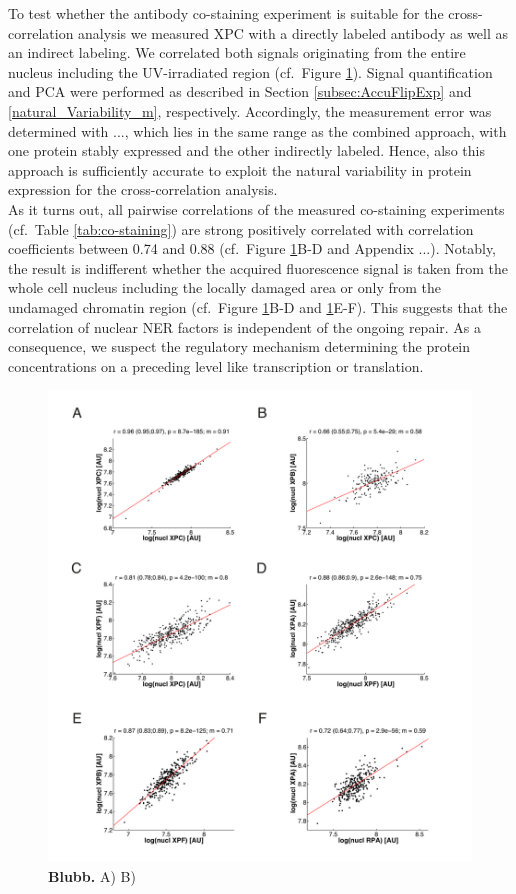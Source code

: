 To test whether the antibody co-staining experiment is suitable for the cross-correlation analysis we measured XPC with a directly labeled antibody as well as an indirect labeling. We correlated both signals originating from the entire nucleus including the UV-irradiated region (cf.\ Figure \ref{fig:coExpressionData}). Signal quantification and PCA were performed as described in Section \ref{subsec:AccuFlipExp} and \ref{natural_Variability_m}, respectively. Accordingly, the measurement error was determined with ..., which lies in the same range as the combined approach, with one protein stably expressed and the other indirectly labeled. Hence, also this approach is sufficiently accurate to exploit the natural variability in protein expression for the cross-correlation analysis.\\ 
As it turns out, all pairwise correlations of the measured co-staining experiments (cf.\ Table \ref{tab:co-staining}) are strong positively correlated with correlation coefficients between 0.74 and 0.88 (cf.\ Figure \ref{fig:coExpressionData}B-D and Appendix ...). Notably, the result is indifferent whether the acquired fluorescence signal is taken from the whole cell nucleus including the locally damaged area or only from the undamaged chromatin region (cf.\ Figure \ref{fig:coExpressionData}B-D and \ref{fig:coExpressionData}E-F). This suggests that the correlation of nuclear NER factors is independent of the ongoing repair. As a consequence, we suspect the regulatory mechanism determining the protein concentrations on a preceding level like transcription or translation.  

\begin{figure}[htbp]
	\begin{center}
		\includegraphics[width=1\textwidth]{Abbildungen/figure4_2.pdf}
		\caption{\textbf{Blubb.} A) B) }
		\label{fig:coExpressionData}
	\end{center}
\end{figure}


